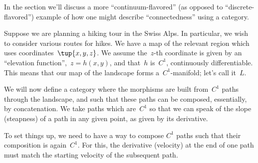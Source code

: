 In the section we'll discuss a more ``continuum-flavored'' (as opposed to ``discrete-flavored'') example of how one might describe ``connectedness'' using a category.


Suppose we are planning a hiking tour in the Swiss Alps. In particular, we wish to consider various routes for hikes. We have a map of the relevant region which uses coordinates~$\tup{x, y, z}$. We assume the~$z$-th coordinate is given by an ``elevation function'',~$z = h(x,y)$, and that~$h$ is~$C^1$,  continuously differentiable. This means that our map of the landscape forms a~$C^1$-manifold; let's call it~$L$.



We will now define a category where the morphisms are built from~$C^1$ paths through the landscape, and such that these paths can be composed, essentially, by concatenation. We take paths which are~$C^1$ so that we can speak of the slope (steapness) of a path in any given point, as given by its derivative.

%
%



To set things up, we need to have a way to compose $C^1$ paths such that their composition is again~$C^1$. For this, the derivative (velocity) at the end of one path must match the starting velocity of the subsequent path.

